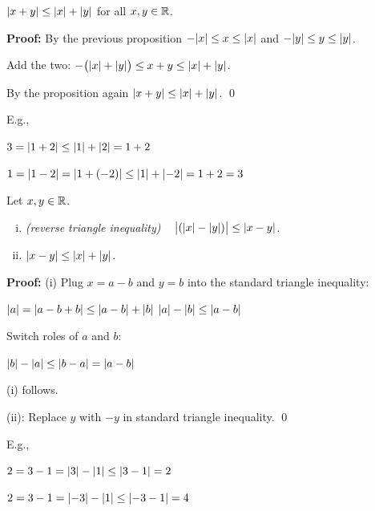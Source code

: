 \documentclass[10pt,aspectratio=169]{beamer}
\begin{document}
\begin{frame}

\begin{proposition}
$\sabs{x+y} \leq \sabs{x}+\sabs{y}$
for all $x, y \in \R$.
\end{proposition}

\pause

\textbf{Proof:}
By the previous proposition \quad
$- \sabs{x} \leq x \leq \sabs{x}$ and
$- \sabs{y} \leq y \leq \sabs{y}$.

\pause
Add the two: \quad $- \bigl(\sabs{x}+\sabs{y}\bigr) \leq x+y \leq \sabs{x}+ \sabs{y}$.

\pause
By the proposition again \quad
$\sabs{x+y} \leq \sabs{x}+\sabs{y}$.
\qed

\medskip
\pause

E.g.,

\pause
$3 = \abs{1+2} \leq \abs{1}+\abs{2} = 1+2$

\pause
$1 = \abs{1-2} = \abs{1+(-2)} \leq \abs{1}+\abs{-2} = 1+2=3$

\end{frame}

\begin{frame}

\begin{corollary}
Let $x,y \in \R$.
\begin{enumerate}[(i)]
\item \emph{(reverse triangle inequality)}
~
$\bigl\lvert (\abs{x}-\abs{y}) \bigr\rvert \leq \abs{x-y}$.
\item \pause$\abs{x-y} \leq \abs{x}+\abs{y}$.
\end{enumerate}
\end{corollary}
\pause

\textbf{Proof:}
(i) Plug $x=a-b$ and $y=b$ into the standard triangle inequality:

$\abs{a} = \abs{a-b+b} \leq \abs{a-b} + \abs{b}$
\pause
\wthus
$\abs{a}-\abs{b} \leq \abs{a-b}$

\pause
Switch roles of $a$ and $b$:

$\abs{b}-\abs{a} \leq \abs{b-a} = \abs{a-b}$

\pause
(i) follows.

\medskip
\pause

(ii): Replace $y$ with $-y$ in standard triangle inequality.
\qed

\medskip
\pause

E.g.,

$2=3-1=\abs{3}-\abs{1} \leq \abs{3-1} = 2$

\pause
$2=3-1=\abs{-3}-\abs{1} \leq \abs{-3-1} = 4$

\end{frame}
\end{document}
